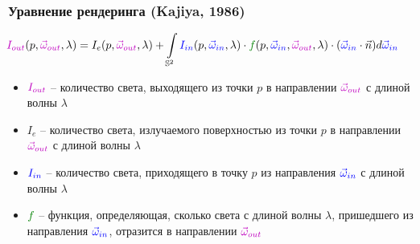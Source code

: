 \documentclass{beamer}
\begin{document}
\begin{frame}[fragile]
\frametitle{Уравнение рендеринга (Kajiya, 1986)}
\begin{equation*}
\hspace*{-0.5cm}
{\color{magenta}I_{out}}(p, {\color{magenta}\vec\omega_{out}}, \lambda) = I_{e}(p, {\color{magenta}\vec\omega_{out}}, \lambda)+\int\limits_{\mathbb S^2} {\color{blue}I_{in}}(p, {\color{blue}\vec\omega_{in}}, \lambda) \cdot {\color{green}f}(p, {\color{blue}\vec\omega_{in}}, {\color{magenta}\vec\omega_{out}}, \lambda) \cdot ({\color{blue}\vec\omega_{in}} \cdot \vec{n}) d{\color{blue}\vec\omega_{in}}
\end{equation*}
\hspace*{-0.5cm}
\pause
\begin{itemize}
\item \begin{math}{\color{magenta}I_{out}}\end{math} -- количество света, выходящего из точки \begin{math}p\end{math} в направлении \begin{math}{\color{magenta}\vec\omega_{out}}\end{math} с длиной волны \begin{math}\lambda\end{math}
\pause
\item \begin{math}I_{e}\end{math} -- количество света, излучаемого поверхностью из точки \begin{math}p\end{math} в направлении \begin{math}{\color{magenta}\vec\omega_{out}}\end{math} с длиной волны \begin{math}\lambda\end{math}
\pause
\item \begin{math}{\color{blue}I_{in}}\end{math} -- количество света, приходящего в точку \begin{math}p\end{math} из направления \begin{math}{\color{blue}\vec\omega_{in}}\end{math} с длиной волны \begin{math}\lambda\end{math}
\pause
\item \begin{math}{\color{green}f}\end{math} -- функция, определяющая, сколько света с длиной волны \begin{math}\lambda\end{math}, пришедшего из направления \begin{math}{\color{blue}\vec\omega_{in}}\end{math}, отразится в направлении \begin{math}{\color{magenta}\vec\omega_{out}}\end{math}

\end{itemize}
\end{frame}
\end{document}

